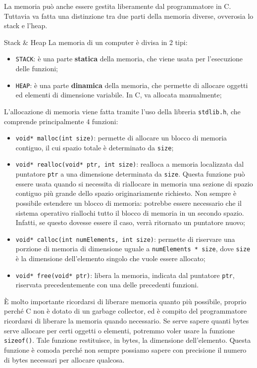 La memoria può anche essere gestita liberamente dal programmatore in C. Tuttavia va fatta una distinzione tra due parti della memoria diverse, ovverosia lo stack e l'heap.

\begin{definition}{Stack \& Heap}
    La memoria di un computer è divisa in 2 tipi:
    \begin{itemize}
        \item \verb|STACK|: è una parte \textbf{statica} della memoria, che viene usata per l'esecuzione delle funzioni;
        \item \verb|HEAP|: è una parte \textbf{dinamica} della memoria, che permette di allocare oggetti ed elementi di dimensione variabile. In C, va allocata manualmente;
    \end{itemize}
\end{definition}

L'allocazione di memoria viene fatta tramite l'uso della libreria \verb|stdlib.h|, che comprende principalmente 4 funzioni:
\begin{itemize}
    \item \verb|void* malloc(int size)|: permette di allocare un blocco di memoria contiguo, il cui spazio totale è determinato da \verb|size|;
    \item \verb|void* realloc(void* ptr, int size)|: realloca a memoria localizzata dal puntatore \verb|ptr| a una dimensione determinata da \verb|size|. Questa funzione può essere usata quando si necessita di riallocare in memoria una sezione di spazio contiguo più grande dello spazio originariamente richiesto. Non sempre è possibile estendere un blocco di memoria: potrebbe essere necessario che il sistema operativo riallochi tutto il blocco di memoria in un secondo spazio. Infatti, se questo dovesse essere il caso, verrà ritornato un puntatore nuovo;
    \item \verb|void* calloc(int numElements, int size)|: permette di riservare una porzione di memoria di dimensione uguale a \verb|numElements * size|, dove \verb|size| è la dimensione dell'elemento singolo che vuole essere allocato;
    \item \verb|void* free(void* ptr)|: libera la memoria, indicata dal puntatore \verb|ptr|, riservata precedentemente con una delle precedenti funzioni.
\end{itemize}

È molto importante ricordarsi di liberare memoria quanto più possibile, proprio perché C non è dotato di un garbage collector, ed è compito del programmatore ricordarsi di liberare la memoria quando necessario.
\nl
Se serve sapere quanti bytes serve allocare per certi oggetti o elementi, potremmo voler usare la funzione \verb|sizeof()|. Tale funzione restituisce, in bytes, la dimensione dell'elemento. Questa funzione è comoda perché non sempre possiamo sapere con precisione il numero di bytes necessari per allocare qualcosa.